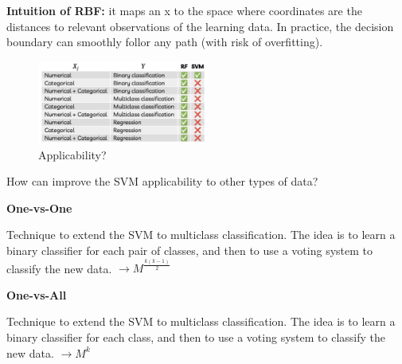 \textbf{Intuition of RBF:} it maps an x to the space where coordinates are the distances to relevant observations of the learning data. In practice, the decision boundary can smoothly follor any path (with risk of overfitting).

\begin{center}
    \begin{figure}[H]
        \centering
        \includegraphics[width=0.5\textwidth]{assets/fig31.png}
        \caption{Applicability?}
    \end{figure}
\end{center}

How can improve the SVM applicability to other types of data?

\newpage
\textbf{One-vs-One}

Technique to extend the SVM to multiclass classification. The idea is to learn a binary classifier for each pair of classes, and then to use a voting system to classify the new data. $\to M^{\frac{k(k-1)}{2}}$ 

\textbf{One-vs-All}

Technique to extend the SVM to multiclass classification. The idea is to learn a binary classifier for each class, and then to use a voting system to classify the new data. $\to M^k$


